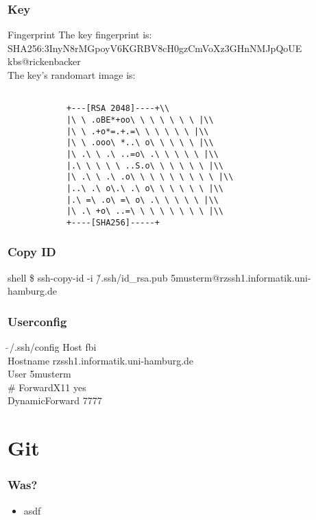 \documentclass{beamer}
\begin{document}
    \begin{frame}
        \frametitle{Key}
        \begin{block}{Fingerprint}
            The key fingerprint is: \\
            SHA256:3InyN8rMGpoyV6KGRBV8cH0gzCmVoXz3GHnNMJpQoUE kbs@rickenbacker\\
            The key's randomart image is:\\
            \begin{verbatim}

            +---[RSA 2048]----+\\
            |\ \ .oBE*+oo\ \ \ \ \ \ \ |\\
            |\ \ .+o*=.+.=\ \ \ \ \ \ |\\
            |\ \ .ooo\ *..\ o\ \ \ \ \ |\\
            |\ .\ \ .\ ..=o\ .\ \ \ \ \ |\\
            |.\ \ \ \ \ ..S.o\ \ \ \ \ \ |\\
            |\ .\ \ .\ .o\ \ \ \ \ \ \ \ \ |\\
            |..\ .\ o\.\ .\ o\ \ \ \ \ \ |\\
            |.\ =\ .o\ =\ o\ .\ \ \ \ \ |\\
            |\ .\ +o\ ..=\ \ \ \ \ \ \ \ |\\
            +----[SHA256]-----+
        \end{verbatim}
        \end{block}
    \end{frame}
    \begin{frame}
        \frametitle{Copy ID}
        \begin{block}{shell}
            \small{\$ ssh-copy-id -i \~/.ssh/id\_rsa.pub 5musterm@rzssh1.informatik.uni-hamburg.de}

        \end{block}
    \end{frame}
    \begin{frame}
        \frametitle{Userconfig}
        \begin{block}{$\tilde \ $/.ssh/config}
            Host fbi\\
            \qquad Hostname rzssh1.informatik.uni-hamburg.de\\
            \qquad User 5musterm\\
            \qquad \# ForwardX11 yes\\
            \qquad DynamicForward 7777\\
        \end{block}
    \end{frame}
\section{Git}
\begin{frame}
    \frametitle{Was?}
    \begin{itemize}
        \item asdf
    \end{itemize}
\end{frame}
\end{document}
